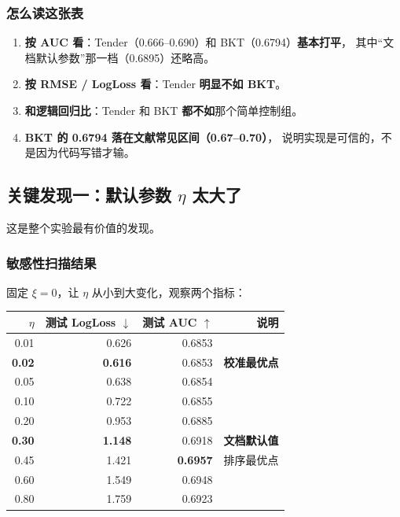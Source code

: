 \documentclass[UTF8,a4paper,11pt]{ctexart}
\newcommand{\hl}[1]{\textcolor{blue!70!black}{\textbf{#1}}}
\newcommand{\warn}[1]{\textcolor{red!70!black}{\textbf{#1}}}
\begin{document}
\subsubsection{怎么读这张表}

\begin{enumerate}[leftmargin=1.8em]
\item \textbf{按 AUC 看}：Tender（0.666–0.690）和 BKT（0.6794）\hl{基本打平}，
      其中“文档默认参数”那一档（0.6895）还略高。
\item \textbf{按 RMSE / LogLoss 看}：Tender \warn{明显不如 BKT}。
\item \textbf{和逻辑回归比}：Tender 和 BKT \warn{都不如}那个简单控制组。
\item \textbf{BKT 的 0.6794 落在文献常见区间（0.67–0.70）}，
      说明实现是可信的，不是因为代码写错才输。
\end{enumerate}

\subsection{关键发现一：默认参数 $\eta$ 太大了}

这是整个实验最有价值的发现。

\subsubsection{敏感性扫描结果}

固定 $\xi = 0$，让 $\eta$ 从小到大变化，观察两个指标：

\begin{center}
\begin{tabular}{rrrr}
\toprule
$\eta$ & \textbf{测试 LogLoss $\downarrow$} & \textbf{测试 AUC $\uparrow$} & \textbf{说明} \\
\midrule
0.01 & 0.626 & 0.6853 & \\
\textbf{0.02} & \textbf{0.616} & 0.6853 & \hl{校准最优点} \\
0.05 & 0.638 & 0.6854 & \\
0.10 & 0.722 & 0.6855 & \\
0.20 & 0.953 & 0.6885 & \\
\textbf{0.30} & \warn{1.148} & 0.6918 & \warn{文档默认值} \\
0.45 & 1.421 & \textbf{0.6957} & 排序最优点 \\
0.60 & 1.549 & 0.6948 & \\
0.80 & 1.759 & 0.6923 & \\
\bottomrule
\end{tabular}
\end{center}
\end{document}
